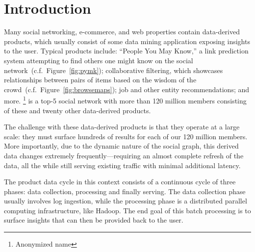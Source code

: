 \section{Introduction}
\label{sec:introduction}

Many social networking, e-commerce, and web properties contain
data-derived products, which usually consist of some data mining
application exposing insights to the user. Typical products include:
``People You May Know,'' a link prediction system attempting to find
others one might know on the social
network~(c.f.~Figure~\ref{fig:pymk}); collaborative filtering, which
showcases relationships between pairs of items based on the wisdom of
the crowd~(c.f.~Figure~\ref{fig:browsemaps}); job and other entity
recommendations; and more. \linkedin\footnote{Anonymized name} is a
top-5 social network with more than 120 million members consisting of
these and twenty other data-derived products. 

The challenge with these data-derived products is that they operate at
a large scale: they must surface hundreds of results for each of our
120 million members. More importantly, due to the dynamic nature of
the social graph, this derived data changes extremely
frequently---requiring an almost complete refresh of the data, all the
while still serving existing traffic with minimal additional latency.

The product data cycle in this context consists of a continuous cycle
of three phases: data collection, processing and finally serving. The
data collection phase usually involves log ingestion, while the
processing phase is a distributed parallel computing infrastructure,
like Hadoop. The end goal of this batch processing is to surface
insights that can then be provided back to the user. 

